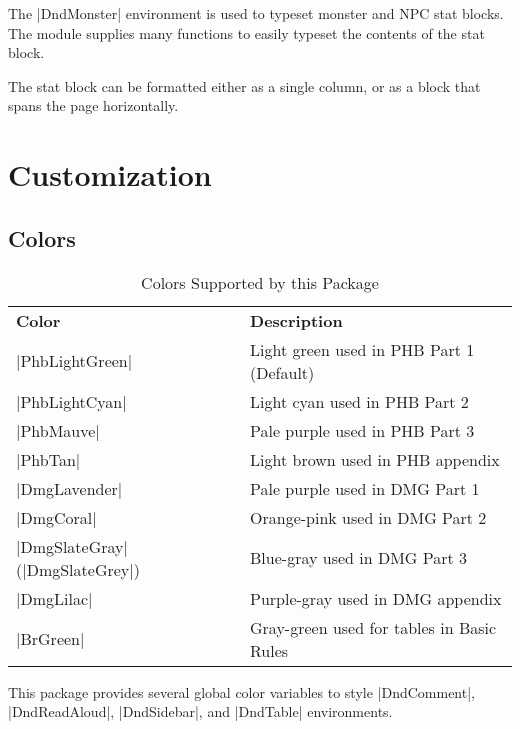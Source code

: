 \documentclass[letterpaper,twocolumn,openany,fancy,nodeprecatedcode]{dndbook}
\begin{document}
The |DndMonster| environment is used to typeset monster and NPC stat blocks. The module supplies many functions to easily typeset the contents of the stat block.

The stat block can be formatted either as a single column, or as a block that spans the page horizontally.

\part{Customization}

\chapter{Colors}

\begin{table*}[b]
  \caption{\DndFontTableTitle{}Colors Supported by this Package}\label{tab:colors}

  \begin{tabularx}{\linewidth}{lX}
    \textbf{Color}                  & \textbf{Description} \\
    \rowcolor{PhbLightGreen}
    |PhbLightGreen|                 & Light green used in PHB Part 1 (Default) \\
    \rowcolor{PhbLightCyan}
    |PhbLightCyan|                  & Light cyan used in PHB Part 2 \\
    \rowcolor{PhbMauve}
    |PhbMauve|                      & Pale purple used in PHB Part 3 \\
    \rowcolor{PhbTan}
    |PhbTan|                        & Light brown used in PHB appendix \\
    \rowcolor{DmgLavender}
    |DmgLavender|                   & Pale purple used in DMG Part 1 \\
    \rowcolor{DmgCoral}
    |DmgCoral|                      & Orange-pink used in DMG Part 2 \\
    \rowcolor{DmgSlateGray}
    |DmgSlateGray| (|DmgSlateGrey|) & Blue-gray used in DMG Part 3 \\
    \rowcolor{DmgLilac}
    |DmgLilac|                      & Purple-gray used in DMG appendix \\
    \rowcolor{BrGreen}
    |BrGreen|                       & Gray-green used for tables in Basic Rules\\
  \end{tabularx}
\end{table*}

This package provides several global color variables to style |DndComment|, |DndReadAloud|, |DndSidebar|, and |DndTable| environments.
\end{document}
